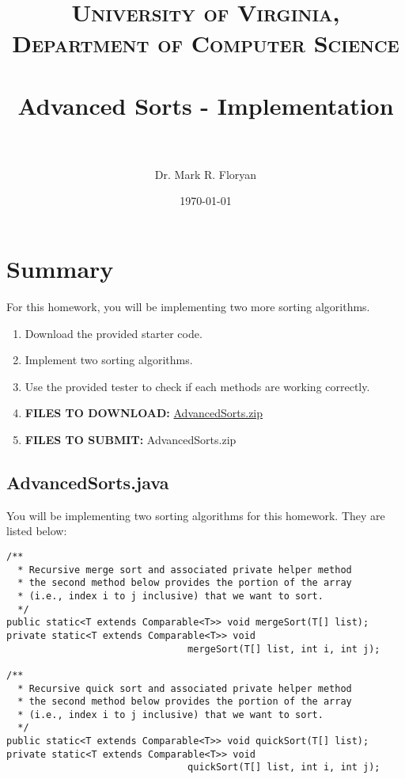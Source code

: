 \documentclass[paper=a4, fontsize=11pt, parskip=full]{scrartcl} %
\title{
\normalfont \normalsize
\textsc{University of Virginia, Department of Computer Science} \\ [25pt] %
\horrule{0.5pt} \\[0.4cm] %
\huge Advanced Sorts - Implementation \\ %
\horrule{2pt} \\[0.5cm] %
}
\author{Dr. Mark R. Floryan} %
\date{\normalsize\today} %
\numberwithin{equation}{section} %
\numberwithin{figure}{section} %
\numberwithin{table}{section} %
\begin{document}
\maketitle %


\section{Summary}

For this homework, you will be implementing two more sorting algorithms.

\begin{enumerate}
	\item Download the provided starter code.
	\item Implement two sorting algorithms.
	\item Use the provided tester to check if each methods are working correctly.
	\item \textbf{FILES TO DOWNLOAD:} \href{https://markfloryan.github.io/dsa1/homeworks/AdvancedSorts/code/AdvancedSorts.zip}{AdvancedSorts.zip}
	\item \textbf{FILES TO SUBMIT:} AdvancedSorts.zip
\end{enumerate}


\subsection{AdvancedSorts.java}

You will be implementing two sorting algorithms for this homework. They are listed below:

\begin{lstlisting}
/**
  * Recursive merge sort and associated private helper method
  * the second method below provides the portion of the array
  * (i.e., index i to j inclusive) that we want to sort.
  */
public static<T extends Comparable<T>> void mergeSort(T[] list);
private static<T extends Comparable<T>> void
								mergeSort(T[] list, int i, int j);

/**
  * Recursive quick sort and associated private helper method
  * the second method below provides the portion of the array
  * (i.e., index i to j inclusive) that we want to sort.
  */
public static<T extends Comparable<T>> void quickSort(T[] list);
private static<T extends Comparable<T>> void
								quickSort(T[] list, int i, int j);
\end{lstlisting}
\end{document}
